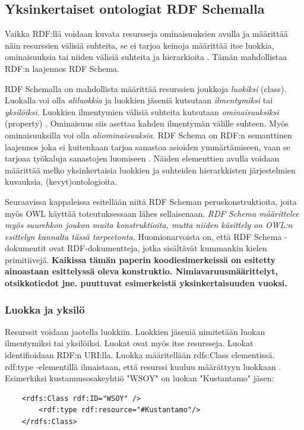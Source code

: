 \documentclass[finnish]{tktltiki2}
\theoremstyle{definition}
\theoremstyle{remark}
\begin{document}
\subsection{Yksinkertaiset ontologiat RDF Schemalla}

Vaikka RDF:llä voidaan kuvata resursseja ominaisuuksien avulla ja määrittää näin resurssien välisiä suhteita, se ei tarjoa keinoja määrittää itse luokkia, ominaisuuksia tai
niiden välisiä suhteita ja hierarkioita \cite{RDFS}. Tämän mahdollistaa RDF:n laajennos
RDF Schema. 

RDF Schemalla on mahdollista määrittää resurssien joukkoja \textit{luokiksi} (class).  Luokalla voi olla  \textit{aliluokkia} ja luokkien jäseniä kutsutaan \textit{ilmentymiksi} tai \textit{yksilöiksi}. Luokkien ilmentymien välisiä suhteita kutsutaan \textit{ominaisuuksiksi} (property) \cite{RDFS}. Ominaisuus siis asettaa kahden ilmentymän välille suhteen. Myös ominaisuuksilla voi olla \textit{aliominaisuuksia}.
RDF Schema on RDF:n semanttinen laajennos joka ei kuitenkaan tarjoa sanastoa asioiden ymmärtämiseen, vaan se tarjoaa työkaluja sanastojen luomiseen \cite{RDFS}. Näiden elementtien avulla voidaan määrittää melko yksinkertaisia luokkien ja suhteiden hierarkkisten järjestelmien kuvauksia, (kevyt)ontologioita.  

Seuraavissa kappaleissa esitellään niitä RDF Scheman peruskonstruktioita, 
joita myös OWL käyttää toteutuksessaan lähes sellaisenaan. \emph{RDF Schema määrittelee myös suurehkon joukon muita konstruktioita, mutta niiden käsittely on OWL:n esittelyn kannalta tässä tarpeetonta.} 
Huomionarvoista on, että RDF Schema -dokumentit ovat RDF-dokumentteja, jotka sisältävät kummankin kielen primitiivejä. \textbf{Kaikissa tämän paperin koodiesimerkeissä on esitetty ainoastaan esittelyssä oleva konstruktio. Nimiavaruusmäärittelyt, otsikkotiedot jne. puuttuvat esimerkeistä yksinkertaisuuden vuoksi.}   

\subsubsection{Luokka ja yksilö}
Resurssit voidaan jaotella luokkiin. Luokkien jäseniä nimitetään luokan ilmentymiksi tai yksilöiksi\cite{RDFS}. Luokat ovat myös itse resursseja. Luokat identifioidaan RDF:n URI:lla. Luokka määritellään rdfs:Class elementissä. rdf:type -elementillä ilmaistaan, että resurssi kuuluu määrättyyn luokkaan \cite{RDFS}. Esimerkiksi kustannusosakeyhtiö "WSOY" on luokan "Kustantamo" jäsen:
\begin{verbatim}
    <rdfs:Class rdf:ID="WSOY" />
        <rdf:type rdf:resource="#Kustantamo"/>
    </rdfs:Class>
\end{verbatim} 
\end{document}
